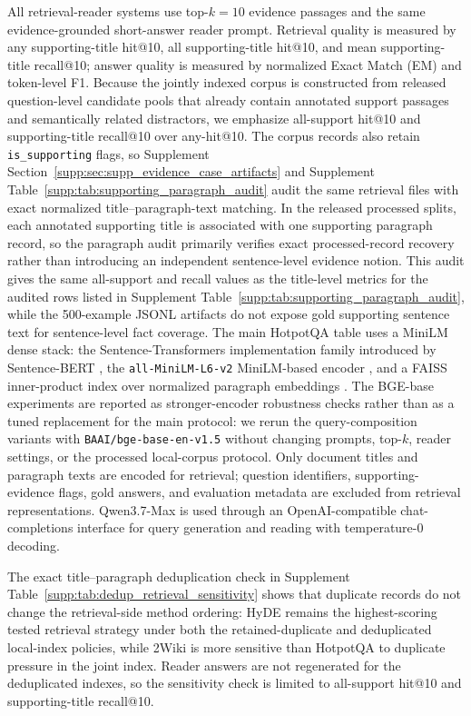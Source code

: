 All retrieval-reader systems use top-$k=10$ evidence passages and the same evidence-grounded short-answer reader prompt. Retrieval quality is measured by any supporting-title hit@10, all supporting-title hit@10, and mean supporting-title recall@10; answer quality is measured by normalized Exact Match (EM) and token-level F1. Because the jointly indexed corpus is constructed from released question-level candidate pools that already contain annotated support passages and semantically related distractors, we emphasize all-support hit@10 and supporting-title recall@10 over any-hit@10. The corpus records also retain \texttt{is\_supporting} flags, so Supplement Section~\ref{supp:sec:supp_evidence_case_artifacts} and Supplement Table~\ref{supp:tab:supporting_paragraph_audit} audit the same retrieval files with exact normalized title--paragraph-text matching. In the released processed splits, each annotated supporting title is associated with one supporting paragraph record, so the paragraph audit primarily verifies exact processed-record recovery rather than introducing an independent sentence-level evidence notion. This audit gives the same all-support and recall values as the title-level metrics for the audited rows listed in Supplement Table~\ref{supp:tab:supporting_paragraph_audit}, while the 500-example JSONL artifacts do not expose gold supporting sentence text for sentence-level fact coverage. The main HotpotQA table uses a MiniLM dense stack: the Sentence-Transformers implementation family introduced by Sentence-BERT \cite{reimers2019sentencebert}, the \texttt{all-MiniLM-L6-v2} MiniLM-based encoder \cite{wang2020minilm}, and a FAISS inner-product index over normalized paragraph embeddings \cite{johnson2019billion}. The BGE-base experiments are reported as stronger-encoder robustness checks rather than as a tuned replacement for the main protocol: we rerun the query-composition variants with \texttt{BAAI/bge-base-en-v1.5} \cite{xiao2023cpack} without changing prompts, top-$k$, reader settings, or the processed local-corpus protocol. Only document titles and paragraph texts are encoded for retrieval; question identifiers, supporting-evidence flags, gold answers, and evaluation metadata are excluded from retrieval representations. Qwen3.7-Max is used through an OpenAI-compatible chat-completions interface for query generation and reading with temperature-0 decoding.

The exact title--paragraph deduplication check in Supplement Table~\ref{supp:tab:dedup_retrieval_sensitivity} shows that duplicate records do not change the retrieval-side method ordering: HyDE remains the highest-scoring tested retrieval strategy under both the retained-duplicate and deduplicated local-index policies, while 2Wiki is more sensitive than HotpotQA to duplicate pressure in the joint index. Reader answers are not regenerated for the deduplicated indexes, so the sensitivity check is limited to all-support hit@10 and supporting-title recall@10.

